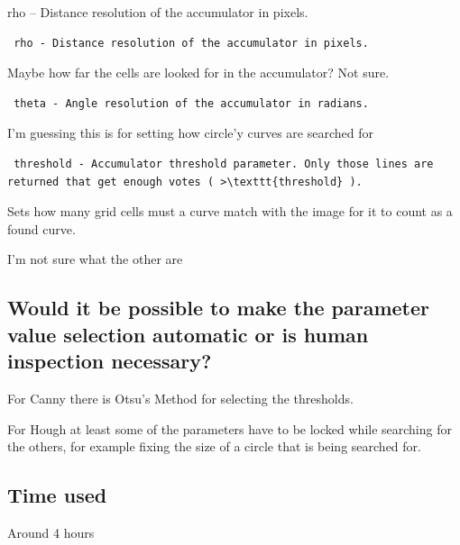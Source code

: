 \documentclass{article}
\begin{document}
rho – Distance resolution of the accumulator in pixels.
\begin{verbatim} rho - Distance resolution of the accumulator in pixels. \end{verbatim}
  Maybe how far the cells are looked for in the accumulator? Not sure.

\begin{verbatim} theta - Angle resolution of the accumulator in radians. \end{verbatim}
  I'm guessing this is for setting how circle'y curves are searched for

\begin{verbatim} threshold - Accumulator threshold parameter. Only those lines are returned that get enough votes ( >\texttt{threshold} ). \end{verbatim}
  Sets how many grid cells must a curve match with the image for it to count as a found curve.




I'm not sure what the other are
\subsection{Would it be possible to make the parameter value selection automatic or is human inspection necessary?}
For Canny there is Otsu's Method for selecting the thresholds.  

For Hough at least some of the parameters have to be locked while searching for the others, for example fixing the size of a circle that is being searched for.

\subsection{Time used}
Around 4 hours
\end{document}
